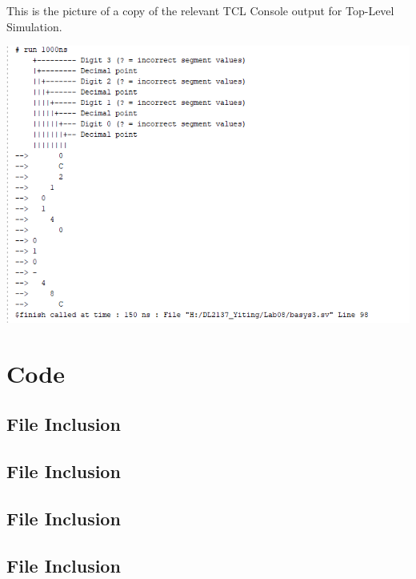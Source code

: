 \documentclass[11pt]{article}
\newcommand{\Verilog}[2][]{%
	
}
\begin{document}
    This is the picture of a copy of the relevant TCL Console output for Top-Level Simulation.
    \begin{center}
        \includegraphics[width=1.2\textwidth]{top_level_simulation}
    \end{center}



\section*{Code}

    \subsection*{File Inclusion}
    \Verilog[caption=mux2 Verilog code,label=code:file_ex]{mux2.sv}

    \subsection*{File Inclusion}
    \Verilog[caption=mux2 Test Benches Verilog code,label=code:file_ex]{mux2_test.sv}


    \subsection*{File Inclusion}
    \Verilog[caption=mux4 Verilog code,label=code:file_ex]{mux4.sv}

    \subsection*{File Inclusion}
    \Verilog[caption=mux4 Test Benches Verilog code,label=code:file_ex]{mux4_test.sv}
\end{document}
